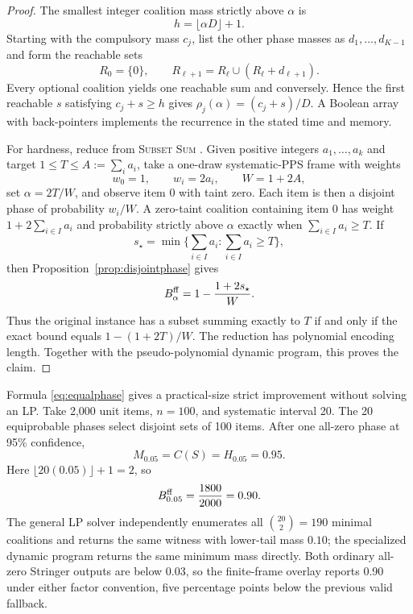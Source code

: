 \documentclass[11pt]{article}
\theoremstyle{definition}
\begin{document}
\begin{proof}
The smallest integer coalition mass strictly above $\alpha$ is
\[
 h=\lfloor\alpha D\rfloor+1.
\]
Starting with the compulsory mass $c_j$, list the other phase masses as
$d_1,\ldots,d_{K-1}$ and form the reachable sets
\[
 R_0=\{0\},\qquad R_{\ell+1}=R_\ell\cup(R_\ell+d_{\ell+1}).
\]
Every optional coalition yields one reachable sum and conversely. Hence the
first reachable $s$ satisfying $c_j+s\ge h$ gives
$\rho_j(\alpha)=(c_j+s)/D$. A Boolean array with back-pointers implements
the recurrence in the stated time and memory.

For hardness, reduce from \textsc{Subset Sum} \cite{gareyjohnson1979}. Given
positive integers $a_1,\ldots,a_k$ and target
$1\le T\le A:=\sum_i a_i$, take a one-draw systematic-PPS frame with weights
\[
 w_0=1,\qquad w_i=2a_i,\qquad W=1+2A,
\]
set $\alpha=2T/W$, and observe item $0$ with taint zero. Each item is then a
disjoint phase of probability $w_i/W$. A zero-taint coalition containing
item $0$ has weight $1+2\sum_{i\in I}a_i$ and probability strictly above
$\alpha$ exactly when $\sum_{i\in I}a_i\ge T$. If
\[
 s_\star=\min\{\textstyle\sum_{i\in I}a_i:
                     \sum_{i\in I}a_i\ge T\},
\]
then Proposition~\ref{prop:disjointphase} gives
\[
 B^{\rm ff}_\alpha=1-\frac{1+2s_\star}{W}.
\]
Thus the original instance has a subset summing exactly to $T$ if and only if
the exact bound equals $1-(1+2T)/W$. The reduction has polynomial encoding
length. Together with the pseudo-polynomial dynamic program, this proves the
claim.
\end{proof}

Formula \eqref{eq:equalphase} gives a practical-size strict improvement
without solving an LP. Take 2,000 unit items,
$n=100$, and systematic interval 20. The 20 equiprobable phases select
disjoint sets of 100 items. After one all-zero phase at 95\% confidence,
\[
 M_{0.05}=C(S)=H_{0.05}=0.95.
\]
Here $\lfloor20(0.05)\rfloor+1=2$, so
\begin{equation}\label{eq:finiteframebenchmark}
 B^{\rm ff}_{0.05}=\frac{1800}{2000}=0.90.
\end{equation}
The general LP solver independently enumerates all
$\binom{20}{2}=190$ minimal coalitions and returns the same witness with
lower-tail mass $0.10$; the specialized dynamic program returns the same
minimum mass directly. Both ordinary all-zero
Stringer outputs are below 0.03, so the finite-frame overlay reports 0.90
under either factor convention, five percentage points below the previous
valid fallback.
\end{document}
